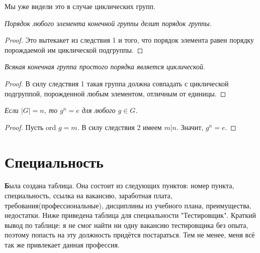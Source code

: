 Мы уже видели это в случае циклических групп.

\begin{Sl}
\emph{Порядок любого элемента конечной группы делит порядок группы.}
\end{Sl}

\begin{proof}
Это вытекакет из следствия 1 и того, что порядок элемента равен порядку порождаемой им циклической подгруппы.
\end{proof}

\begin{Sl}
\emph{Всякая конечная группа простого порядка является циклической.}
\end{Sl}

\begin{proof}
В силу следствия 1 такая группа должна совпадать с циклической подгруппой, порожденной любым элементом, отличным от единицы.
\end{proof}

\begin{Sl}
\emph{Если $|G| = n$, то $g^n = e$ для любого $g \in G$.}
\end{Sl}

\begin{proof}
Пусть ord $g = m$. В силу следствия 2 имеем $m | n$. Значит, $g^n = e$.
\end{proof}
\cite{учебник} 
\newpage
\section{Специальность}
\textbf Была создана таблица. Она состоит из следующих пунктов: номер пункта, специальность, ссылка на вакансию, заработная плата, требования(профессиональные), дисциплины из учебного плана, преимущества, недостатки. Ниже приведена таблица для специальности "Тестировщик". Краткий вывод по таблице: я не смог найти ни одну вакансию тестировщика без опыта, поэтому попасть на эту должность придётся постараться. Тем не менее, меня всё так же привлекает данная профессия.
\cite{ххру}

